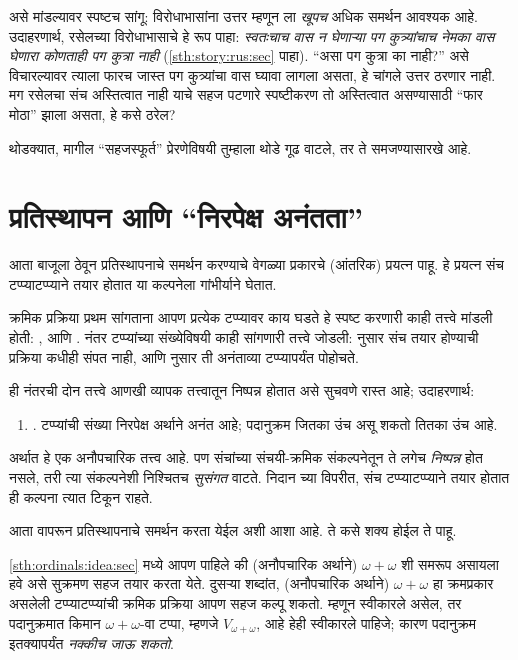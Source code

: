 असे मांडल्यावर स्पष्टच सांगू: विरोधाभासांना उत्तर म्हणून \limofsize{} ला \emph{खूपच} अधिक समर्थन आवश्यक आहे. उदाहरणार्थ, रसेलच्या विरोधाभासाचे हे रूप पाहा: \emph{स्वतःचाच वास न घेणाऱ्या पग कुत्र्यांचाच नेमका वास घेणारा कोणताही पग कुत्रा नाही} (\ref{sth:story:rus:sec} पाहा). ``असा पग कुत्रा का नाही?'' असे विचारल्यावर त्याला फारच जास्त पग कुत्र्यांचा वास घ्यावा लागला असता, हे चांगले उत्तर ठरणार नाही. मग रसेलचा संच अस्तित्वात नाही याचे सहज पटणारे स्पष्टीकरण तो अस्तित्वात असण्यासाठी ``फार मोठा'' झाला असता, हे कसे ठरेल?

थोडक्यात, \limofsize{} मागील ``सहजस्फूर्त'' प्रेरणेविषयी तुम्हाला थोडे गूढ वाटले, तर ते समजण्यासारखे आहे.







\section{प्रतिस्थापन आणि ``निरपेक्ष अनंतता''}\label{sth:replacement:absinf:sec}

आता \limofsize{} बाजूला ठेवून प्रतिस्थापनाचे समर्थन करण्याचे वेगळ्या प्रकारचे (आंतरिक) प्रयत्न पाहू. हे प्रयत्न संच टप्प्याटप्प्याने तयार होतात या कल्पनेला गांभीर्याने घेतात.

क्रमिक प्रक्रिया प्रथम सांगताना आपण प्रत्येक टप्प्यावर काय घडते हे स्पष्ट करणारी काही तत्त्वे मांडली होती: \stageshier, \stagesord आणि \stagesacc. नंतर टप्प्यांच्या संख्येविषयी काही सांगणारी तत्त्वे जोडली: \stagessucc{} नुसार संच तयार होण्याची प्रक्रिया कधीही संपत नाही, आणि \stagesinf{} नुसार ती अनंताव्या टप्प्यापर्यंत पोहोचते.

ही नंतरची दोन तत्त्वे आणखी व्यापक तत्त्वातून निष्पन्न होतात असे सुचवणे रास्त आहे; उदाहरणार्थ:
\begin{enumerate}
  \item[] \stagesinex. टप्प्यांची संख्या निरपेक्ष अर्थाने अनंत आहे; पदानुक्रम जितका उंच असू शकतो तितका उंच आहे.
\end{enumerate}
अर्थात हे एक अनौपचारिक तत्त्व आहे. पण संचांच्या संचयी-क्रमिक संकल्पनेतून ते लगेच \emph{निष्पन्न} होत नसले, तरी त्या संकल्पनेशी निश्चितच \emph{सुसंगत} वाटते. निदान \limofsize{} च्या विपरीत, संच टप्प्याटप्प्याने तयार होतात ही कल्पना त्यात टिकून राहते.

आता \stagesinex{} वापरून प्रतिस्थापनाचे समर्थन करता येईल अशी आशा आहे. ते कसे शक्य होईल ते पाहू.

\ref{sth:ordinals:idea:sec} मध्ये आपण पाहिले की (अनौपचारिक अर्थाने) $\omega+\omega$ शी समरूप असायला हवे असे सुक्रमण सहज तयार करता येते. दुसऱ्या शब्दांत, (अनौपचारिक अर्थाने) $\omega+\omega$ हा क्रमप्रकार असलेली टप्प्याटप्प्यांची क्रमिक प्रक्रिया आपण सहज कल्पू शकतो. म्हणून \stagesinex{} स्वीकारले असेल, तर पदानुक्रमात किमान $\omega+\omega$-वा टप्पा, म्हणजे $V_{\omega+\omega}$, आहे हेही स्वीकारले पाहिजे; कारण पदानुक्रम इतक्यापर्यंत \emph{नक्कीच जाऊ शकतो}.

